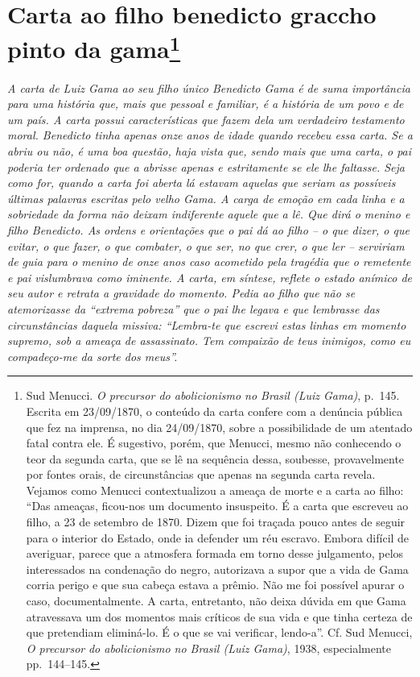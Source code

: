 {\chapter{Carta ao filho benedicto graccho pinto da gama\footnote{Sud Menucci. \emph{O precursor do abolicionismo no
  Brasil (Luiz Gama)}, p.~145. Escrita em 23/09/1870, o conteúdo da
  carta confere com a denúncia pública que fez na imprensa, no dia
  24/09/1870, sobre a possibilidade de um atentado fatal contra ele. É
  sugestivo, porém, que Menucci, mesmo não conhecendo o teor da segunda
  carta, que se lê na sequência dessa, soubesse, provavelmente por
  fontes orais, de circunstâncias que apenas na segunda carta revela.
  Vejamos como Menucci contextualizou a ameaça de morte e a carta ao
  filho: ``Das ameaças, ficou-nos um documento insuspeito. É a carta que
  escreveu ao filho, a 23 de setembro de 1870. Dizem que foi traçada
  pouco antes de seguir para o interior do Estado, onde ia defender um
  réu escravo. Embora difícil de averiguar, parece que a atmosfera
  formada em torno desse julgamento, pelos interessados na condenação do
  negro, autorizava a supor que a vida de Gama corria perigo e que sua
  cabeça estava a prêmio. Não me foi possível apurar o caso,
  documentalmente. A carta, entretanto, não deixa dúvida em que Gama
  atravessava um dos momentos mais críticos de sua vida e que tinha
  certeza de que pretendiam eliminá-lo. É o que se vai verificar,
  lendo-a''. Cf. Sud Menucci, \emph{O precursor} \emph{do abolicionismo
  no Brasil (Luiz Gama)}, 1938, especialmente pp.~144--145.}} %

\begin{didascalia}
\emph{A carta de Luiz Gama ao seu filho único Benedicto Gama é de suma
importância para uma história que, mais que pessoal e familiar, é a
história de um povo e de um país. A carta possui características que
fazem dela um verdadeiro testamento moral. Benedicto tinha apenas onze
anos de idade quando recebeu essa carta. Se a abriu ou não, é uma boa
questão, haja vista que, sendo mais que uma carta, o pai poderia ter
ordenado que a abrisse apenas e estritamente se ele lhe faltasse. Seja
como for, quando a carta foi aberta lá estavam aquelas que seriam as
possíveis últimas palavras escritas pelo velho Gama. A carga de emoção
em cada linha e a sobriedade da forma não deixam indiferente aquele que
a lê. Que dirá o menino e filho Benedicto. As ordens e orientações que o
pai dá ao filho -- o que dizer, o que evitar, o que fazer, o que
combater, o que ser, no que crer, o que ler -- serviriam de guia para o
menino de onze anos caso acometido pela tragédia que o remetente e pai
vislumbrava como iminente. A carta, em síntese, reflete o estado anímico
de seu autor e retrata a gravidade do momento. Pedia ao filho que não se
atemorizasse da ``extrema pobreza'' que o pai lhe legava e que lembrasse
das circunstâncias daquela missiva: ``Lembra-te que escrevi estas linhas
em momento supremo, sob a ameaça de assassinato. Tem compaixão de teus
inimigos, como eu compadeço-me da sorte dos meus''.}
\end{didascalia}


}
